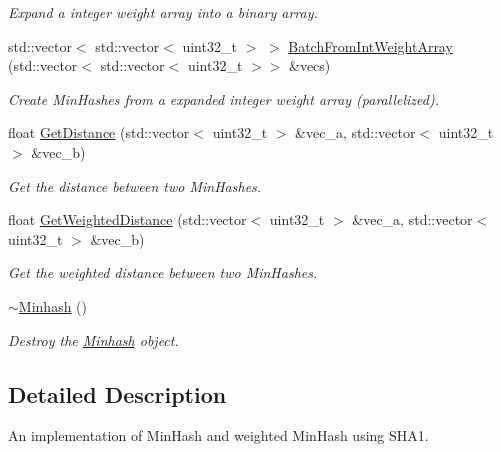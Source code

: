 \begin{DoxyCompactItemize}
\begin{DoxyCompactList}\small\item\em Expand a integer weight array into a binary array. \end{DoxyCompactList}\item 
std\+::vector$<$ std\+::vector$<$ uint32\+\_\+t $>$ $>$ \hyperlink{classtmap_1_1Minhash_ac0112cf3a99b2e882803a07dc0f0a620}{Batch\+From\+Int\+Weight\+Array} (std\+::vector$<$ std\+::vector$<$ uint32\+\_\+t $>$$>$ \&vecs)
\begin{DoxyCompactList}\small\item\em Create Min\+Hashes from a expanded integer weight array (parallelized). \end{DoxyCompactList}\item 
float \hyperlink{classtmap_1_1Minhash_a21df254dd86462a1dcbe45285c747e71}{Get\+Distance} (std\+::vector$<$ uint32\+\_\+t $>$ \&vec\+\_\+a, std\+::vector$<$ uint32\+\_\+t $>$ \&vec\+\_\+b)
\begin{DoxyCompactList}\small\item\em Get the distance between two Min\+Hashes. \end{DoxyCompactList}\item 
float \hyperlink{classtmap_1_1Minhash_a7a8090c1629a6783fe0e17b227bd59ca}{Get\+Weighted\+Distance} (std\+::vector$<$ uint32\+\_\+t $>$ \&vec\+\_\+a, std\+::vector$<$ uint32\+\_\+t $>$ \&vec\+\_\+b)
\begin{DoxyCompactList}\small\item\em Get the weighted distance between two Min\+Hashes. \end{DoxyCompactList}\item 
\mbox{\label{classtmap_1_1Minhash_ae5e1e056f6a1179651b7fa6c196bf220}} 
\hyperlink{classtmap_1_1Minhash_ae5e1e056f6a1179651b7fa6c196bf220}{$\sim$\+Minhash} ()
\begin{DoxyCompactList}\small\item\em Destroy the \hyperlink{classtmap_1_1Minhash}{Minhash} object. \end{DoxyCompactList}\end{DoxyCompactItemize}


\subsection{Detailed Description}
An implementation of Min\+Hash and weighted Min\+Hash using S\+H\+A1. 

